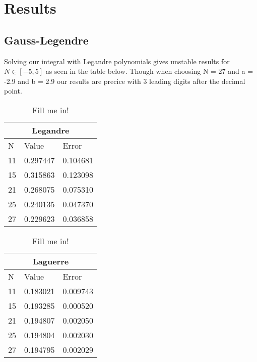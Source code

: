 \documentclass[../main.tex]{subfiles}
\begin{document}
\section{Results} \label{sec:results}
\subsection{Gauss-Legendre} \label{sec:QMProbresults}

Solving our integral with Legandre polynomials gives unstable results for $N \in [-5,5]$ as seen in the table below. Though when choosing N = 27 and a = -2.9 and b = 2.9 our results are precice with 3 leading digits after the decimal point.

\begin{table}[h!]
\begin{center}
  \begin{tabular}{ |p{1cm}|p{3cm}|p{3cm}|}
 \hline
 \multicolumn{3}{|c|}{Legandre} \\
 \hline
       N   & Value & Error\\
 \hline
 11 & 0.297447 & 0.104681\\
 15 & 0.315863 & 0.123098\\
 21 & 0.268075 & 0.075310\\
 25 & 0.240135 & 0.047370\\
 27 & 0.229623 & 0.036858\\
 \hline
 \end{tabular}
 \caption{Fill me in!}
 \end{center}
\end{table}

\begin{table}[h!]
\begin{center}
\begin{tabular}{ |p{1cm}|p{3cm}|p{3cm}|}
 \hline
 \multicolumn{3}{|c|}{Laguerre} \\
 \hline
       N   & Value & Error\\
 \hline
 11 &  0.183021 &  0.009743\\
 15 &  0.193285 &  0.000520\\
 21 &  0.194807 &  0.002050\\
 25 &  0.194804 &  0.002030\\
 27 &  0.194795 &  0.002029\\

 \hline
\end{tabular}
\caption{Fill me in!}
\end{center}
\end{table}
\end{document}
